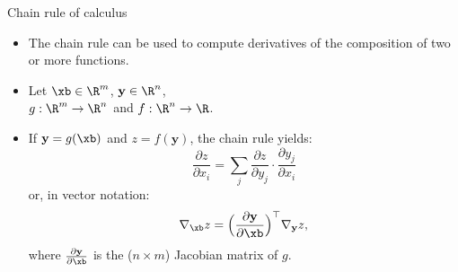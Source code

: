 \begin{vbframe}{Chain rule of calculus}
  \begin{itemize}
    \item The chain rule can be used to compute derivatives of the composition of two or more functions.
    \item Let $\xb \in \R^m$, $\mathbf{y} \in \R^n$, \\
          $g: \R^m \to \R^n$ and $f: \R^n \to \R$. \\
    \item If $\mathbf{y} = g(\xb)$ and $z = f(\mathbf{y})$, the chain rule yields: $$\frac{\partial z}{\partial x_i} = \sum_j \frac{\partial z}{\partial y_j} \cdot \frac{\partial y_j}{\partial x_i}$$
          or, in vector notation: $$\nabla_{\xb} z = \Big(\frac{\partial \mathbf{y}}{\partial \xb}\Big)^\top \nabla_{\mathbf{y}} z,$$
          where $\frac{\partial \mathbf{y}}{\partial \xb}$ is the ($n \times m$) Jacobian matrix of $g$.
  \end{itemize}
\end{vbframe}  

